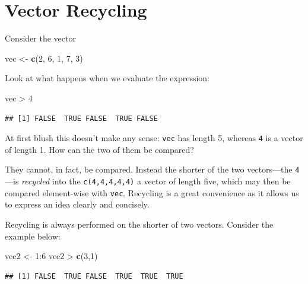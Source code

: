 \documentclass[]{book}
\makeatletter
\newenvironment{Shaded}{\begin{snugshade}}{\end{snugshade}}
\newcommand{\KeywordTok}[1]{\textcolor[rgb]{0.13,0.29,0.53}{\textbf{{#1}}}}
\newcommand{\DecValTok}[1]{\textcolor[rgb]{0.00,0.00,0.81}{{#1}}}
\newcommand{\StringTok}[1]{\textcolor[rgb]{0.31,0.60,0.02}{{#1}}}
\newcommand{\NormalTok}[1]{{#1}}
\newenvironment{kframe}{%
\medskip{}
\setlength{\fboxsep}{.8em}
 \def\at@end@of@kframe{}%
 \ifinner\ifhmode%
  \def\at@end@of@kframe{\end{minipage}}%
  \begin{minipage}{\columnwidth}%
 \fi\fi%
 \def\FrameCommand##1{\hskip\@totalleftmargin \hskip-\fboxsep
 \colorbox{shadecolor}{##1}\hskip-\fboxsep
     \hskip-\linewidth \hskip-\@totalleftmargin \hskip\columnwidth}%
 \MakeFramed {\advance\hsize-\width
   \@totalleftmargin\z@ \linewidth\hsize
   \@setminipage}}%
 {\par\unskip\endMakeFramed%
 \at@end@of@kframe}
\renewenvironment{Shaded}{\begin{kframe}}{\end{kframe}}
\theoremstyle{definition}
\theoremstyle{definition}
\theoremstyle{remark}
\makeatother
\begin{document}
\section{\texorpdfstring{Vector Recycling
}{Vector Recycling }}\label{vector-recycling}

Consider the vector

\begin{Shaded}
\begin{Highlighting}[]
\NormalTok{vec <-}\StringTok{ }\KeywordTok{c}\NormalTok{(}\DecValTok{2}\NormalTok{, }\DecValTok{6}\NormalTok{, }\DecValTok{1}\NormalTok{, }\DecValTok{7}\NormalTok{, }\DecValTok{3}\NormalTok{)}
\end{Highlighting}
\end{Shaded}

Look at what happens when we evaluate the expression:

\begin{Shaded}
\begin{Highlighting}[]
\NormalTok{vec >}\StringTok{ }\DecValTok{4}
\end{Highlighting}
\end{Shaded}

\begin{verbatim}
## [1] FALSE  TRUE FALSE  TRUE FALSE
\end{verbatim}

At first blush this doesn't make any sense: \texttt{vec} has length 5,
whereas \texttt{4} is a vector of length 1. How can the two of them be
compared?

They cannot, in fact, be compared. Instead the shorter of the two
vectors---the \texttt{4}---is \emph{recycled} into the
\texttt{c(4,4,4,4,4)} a vector of length five, which may then be
compared element-wise with \texttt{vec}. Recycling is a great
convenience as it allows us to express an idea clearly and concisely.

Recycling is always performed on the shorter of two vectors. Consider
the example below:

\begin{Shaded}
\begin{Highlighting}[]
\NormalTok{vec2 <-}\StringTok{ }\DecValTok{1}\NormalTok{:}\DecValTok{6}
\NormalTok{vec2 >}\StringTok{ }\KeywordTok{c}\NormalTok{(}\DecValTok{3}\NormalTok{,}\DecValTok{1}\NormalTok{)}
\end{Highlighting}
\end{Shaded}

\begin{verbatim}
## [1] FALSE  TRUE FALSE  TRUE  TRUE  TRUE
\end{verbatim}
\end{document}

